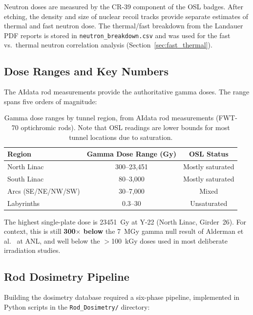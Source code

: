 \documentclass[11pt,letterpaper]{article}
\begin{document}
\begin{description}[style=nextline]
    \item[Neutron Dosimetry (CR-39 Track Etch)]
    Neutron doses are measured by the CR-39 component of the OSL badges. After
    etching, the density and size of nuclear recoil tracks provide separate
    estimates of thermal and fast neutron dose. The thermal/fast breakdown from
    the Landauer PDF reports is stored in \texttt{neutron\_breakdown.csv} and
    was used for the fast vs.\ thermal neutron correlation analysis
    (Section~\ref{sec:fast_thermal}).
\end{description}

\subsection{Dose Ranges and Key Numbers}

The AIdata rod measurements provide the authoritative gamma doses. The range
spans five orders of magnitude:

\begin{table}[H]
\centering
\caption{Gamma dose ranges by tunnel region, from AIdata rod measurements
(FWT-70 optichromic rods). Note that OSL readings are lower bounds for most
tunnel locations due to saturation.}
\label{tab:dose_ranges}
\begin{tabular}{@{}lcc@{}}
\toprule
\textbf{Region} & \textbf{Gamma Dose Range (Gy)} & \textbf{OSL Status} \\
\midrule
North Linac    & 300--23,451 & Mostly saturated \\
South Linac    & 80--3,000   & Mostly saturated \\
Arcs (SE/NE/NW/SW) & 30--7,000 & Mixed \\
Labyrinths     & 0.3--30     & Unsaturated \\
\bottomrule
\end{tabular}
\end{table}

The highest single-plate dose is \SI{23451}{Gy} at Y-22 (North Linac,
Girder~26). For context, this is still \textbf{300$\times$ below} the
\SI{7}{MGy} gamma null result of Alderman et al.~\cite{Alderman} at ANL, and well below the
$>$\SI{100}{kGy} doses used in most deliberate irradiation studies.

\subsection{Rod Dosimetry Pipeline}

Building the dosimetry database required a six-phase pipeline, implemented in
Python scripts in the \texttt{Rod\_Dosimetry/} directory:
\end{document}
